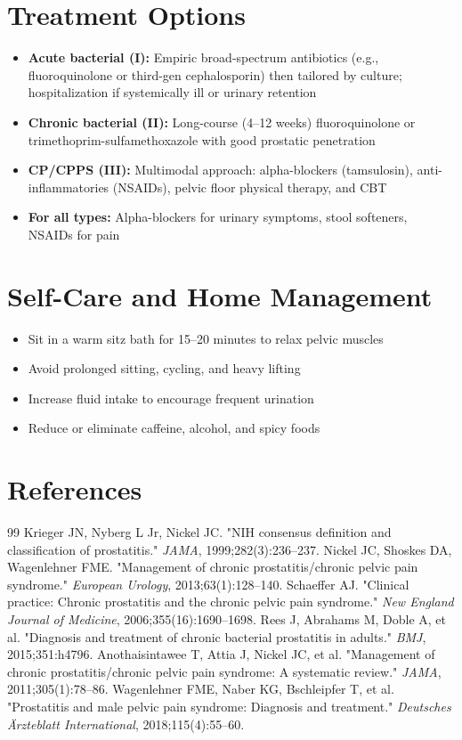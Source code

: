 \section*{Treatment Options}
\begin{itemize}
  \item \textbf{Acute bacterial (I):} Empiric broad-spectrum antibiotics (e.g., fluoroquinolone or third-gen cephalosporin) then tailored by culture; hospitalization if systemically ill or urinary retention
  \item \textbf{Chronic bacterial (II):} Long-course (4--12 weeks) fluoroquinolone or trimethoprim-sulfamethoxazole with good prostatic penetration
  \item \textbf{CP/CPPS (III):} Multimodal approach: alpha-blockers (tamsulosin), anti-inflammatories (NSAIDs), pelvic floor physical therapy, and CBT
  \item \textbf{For all types:} Alpha-blockers for urinary symptoms, stool softeners, NSAIDs for pain
\end{itemize}

\section*{Self-Care and Home Management}
\begin{itemize}
  \item Sit in a warm sitz bath for 15--20 minutes to relax pelvic muscles
  \item Avoid prolonged sitting, cycling, and heavy lifting
  \item Increase fluid intake to encourage frequent urination
  \item Reduce or eliminate caffeine, alcohol, and spicy foods
\end{itemize}

\section*{References}
\begin{thebibliography}{99}
 Krieger JN, Nyberg L Jr, Nickel JC. "NIH consensus definition and classification of prostatitis." \textit{JAMA}, 1999;282(3):236--237.
 Nickel JC, Shoskes DA, Wagenlehner FME. "Management of chronic prostatitis/chronic pelvic pain syndrome." \textit{European Urology}, 2013;63(1):128--140.
 Schaeffer AJ. "Clinical practice: Chronic prostatitis and the chronic pelvic pain syndrome." \textit{New England Journal of Medicine}, 2006;355(16):1690--1698.
 Rees J, Abrahams M, Doble A, et al. "Diagnosis and treatment of chronic bacterial prostatitis in adults." \textit{BMJ}, 2015;351:h4796.
 Anothaisintawee T, Attia J, Nickel JC, et al. "Management of chronic prostatitis/chronic pelvic pain syndrome: A systematic review." \textit{JAMA}, 2011;305(1):78--86.
 Wagenlehner FME, Naber KG, Bschleipfer T, et al. "Prostatitis and male pelvic pain syndrome: Diagnosis and treatment." \textit{Deutsches \"{A}rzteblatt International}, 2018;115(4):55--60.
\end{thebibliography}
